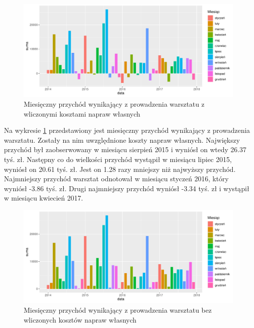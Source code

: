 \documentclass{article}\usepackage[]{graphicx}\usepackage[]{xcolor}
\makeatletter
\def\maxwidth{ %
  \ifdim\Gin@nat@width>\linewidth
    \linewidth
  \else
    \Gin@nat@width
  \fi
}
\newenvironment{knitrout}{}{} %
\makeatother
\begin{document}
\begin{knitrout}
\color{fgcolor}\begin{figure}[H]

{\centering \includegraphics[width=\maxwidth]{figure/fig_uslugi-1} 

}

\caption[Miesięczny przychód wynikający z prowadzenia warsztatu z wliczonymi kosztami napraw własnych]{Miesięczny przychód wynikający z prowadzenia warsztatu z wliczonymi kosztami napraw własnych}\label{fig:fig_uslugi}
\end{figure}

\end{knitrout}

Na wykresie \ref{fig:fig_uslugi} przedstawiony jest miesięczny przychód wynikający z prowadzenia warsztatu. Zostały na nim uwzględnione koszty napraw własnych. 
Największy przychód był zaobserwowany w miesiącu sierpień 2015 i wyniósł on wtedy 26.37 tyś. zł.
Następny co do wielkości przychód wystąpił w miesiącu lipiec 2015, wyniósł on 20.61 tyś. zł. Jest on 1.28 razy mniejszy niż najwyższy przychód.
Najmniejszy przychód warsztat odnotował w miesiącu styczeń 2016, który wyniósł -3.86 tyś. zł. 
Drugi najmniejszy przychód wyniósł -3.34 tyś. zł i wystąpił w miesiącu kwiecień 2017.

\begin{knitrout}
\color{fgcolor}\begin{figure}[H]

{\centering \includegraphics[width=\maxwidth]{figure/fig_uslugi2-1} 

}

\caption[Miesięczny przychód wynikający z prowadzenia warsztatu bez wliczonych kosztów napraw własnych]{Miesięczny przychód wynikający z prowadzenia warsztatu bez wliczonych kosztów napraw własnych}\label{fig:fig_uslugi2}
\end{figure}

\end{knitrout}
\end{document}
